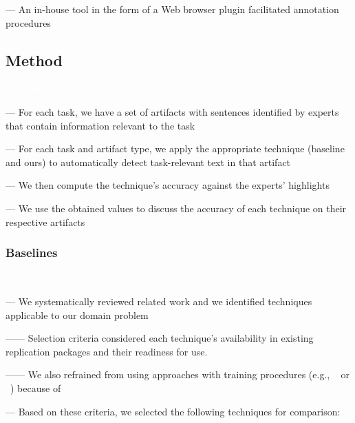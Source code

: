 --- An in-house tool in the form of a Web browser plugin facilitated annotation procedures

\subsection{Method}
\textcolor{white}{force ident} %

--- For each task, we have a set of artifacts with sentences identified by experts that contain information relevant to the task \vspace{3mm}

--- For each task and artifact type, we apply the appropriate technique (baseline and ours) to automatically detect task-relevant text in that artifact

--- We then compute the technique's accuracy against the experts' highlights 

--- We use the obtained values to discuss the accuracy of each technique on their respective artifacts



\subsubsection{Baselines}
\label{cp4:comparison-techniques}
\textcolor{white}{force ident} %

--- We systematically reviewed related work and we identified techniques applicable to our domain problem

------ Selection criteria considered each technique's availability in existing replication packages and their readiness for use.

------ We also refrained from using approaches with training procedures (e.g., ~\cite{liu2020} or ~\cite{Treude2016}) because of ~\cite{Chaparro2017, fucci2019} \vspace{3mm}


--- Based on these criteria, we selected the following techniques for comparison:


